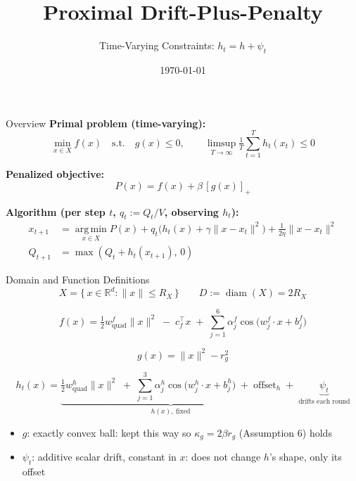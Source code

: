\documentclass{beamer}
\title{Proximal Drift-Plus-Penalty}
\subtitle{Time-Varying Constraints: $h_t = h + \psi_t$}
\author{}
\date{\today}
\begin{document}
\begin{frame}
  \titlepage
\end{frame}

\begin{frame}{Overview}
  \small
  \textbf{Primal problem (time-varying):}
  \[
    \min_{x \in X} f(x) \quad \text{s.t.} \quad g(x) \le 0,
    \qquad \limsup_{T\to\infty} \tfrac1T \sum_{t=1}^T h_t(x_t) \le 0
  \]

  \textbf{Penalized objective:}
  \[
    P(x) = f(x) + \beta\,[g(x)]_+
  \]

  \textbf{Algorithm (per step $t$, $q_t := Q_t/V$, observing $h_t$):}
  \begin{align*}
    x_{t+1} &= \operatorname*{arg\,min}_{x \in X} P(x) + q_t\big(h_t(x)+\gamma\|x-x_t\|^2\big) + \tfrac{1}{2\eta}\|x-x_t\|^2 \\
    Q_{t+1} &= \max(Q_t + h_t(x_{t+1}),\,0)
  \end{align*}
\end{frame}

\begin{frame}{Domain and Function Definitions}
  \[
    X = \{\, x \in \mathbb{R}^d : \|x\| \le R_X \,\} \qquad D := \operatorname{diam}(X) = 2R_X
  \]

  \[
    f(x) = \tfrac{1}{2} w^f_{\mathrm{quad}}\|x\|^2 \;-\; c_f^\top x \;+\; \sum_{j=1}^{6} \alpha^f_j \cos\big(w^f_j \cdot x + b^f_j\big)
  \]

  \[
    g(x) = \|x\|^2 - r_g^2
  \]

  \[
    h_t(x) = \underbrace{\tfrac{1}{2} w^h_{\mathrm{quad}}\|x\|^2 \;+\; \sum_{j=1}^{3} \alpha^h_j \cos\big(w^h_j \cdot x + b^h_j\big) \;+\; \text{offset}_h}_{h(x),\ \text{fixed}} \;+\; \underbrace{\psi_t}_{\text{drifts each round}}
  \]

  \begin{itemize}
    \item $g$: exactly convex ball: kept this way so $\kappa_g = 2\beta r_g$ (Assumption 6) holds
    \item $\psi_t$: additive scalar drift, constant in $x$: does not change $h$'s shape, only its offset
  \end{itemize}
\end{frame}
\end{document}
